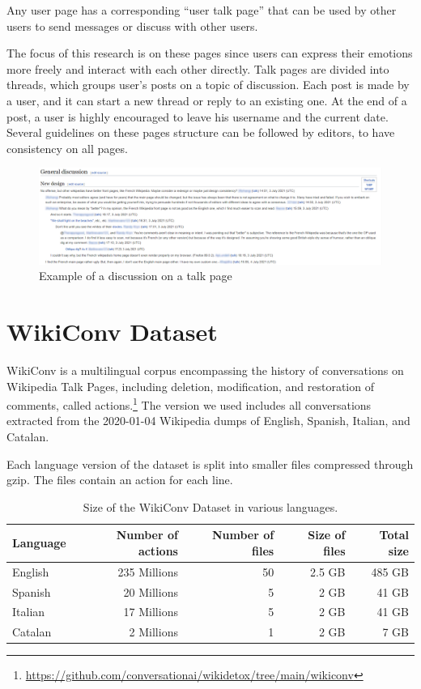 Any user page has a corresponding “user talk page” that can be used by other users to send messages or discuss with other users.

The focus of this research is on these pages since users can express their emotions more freely and interact with each other directly. Talk pages are divided into threads, which groups user’s posts on a topic of discussion. Each post is made by a user, and it can start a new thread or reply to an existing one. At the end of a post, a user is highly encouraged to leave his username and the current date. Several guidelines on these pages structure can be followed by editors, to have consistency on all pages.

\begin{figure}[H]
    \centering
    \includegraphics[width=1\textwidth]{./img/discussion.jpg}
    \caption{Example of a discussion on a talk page}
    \label{fig:discussion}
\end{figure}


\section{WikiConv Dataset}
\label{sec:wikiconvdataset}
WikiConv is a multilingual corpus encompassing the history of conversations on Wikipedia Talk Pages, including deletion, modification, and restoration of comments, called actions.\footnote{\url{https://github.com/conversationai/wikidetox/tree/main/wikiconv}} The version we used includes all conversations extracted from the 2020-01-04 Wikipedia dumps of English, Spanish, Italian, and Catalan.

Each language version of the dataset is split into smaller files compressed through gzip. The files contain an action for each line.

\begin{table}[H]
    \centering
    \begin{tabularx}{\columnwidth}{@{}Xrrrr@{}}
        \midrule
        \textbf{Language} & \textbf{Number of actions} & \textbf{Number of files} & \textbf{Size of files} & \textbf{Total size}\\ \toprule
        English & 235 Millions & 50 & 2.5 GB & 485 GB \\
        Spanish & 20 Millions & 5 & 2 GB & 41 GB \\
        Italian & 17 Millions & 5 & 2 GB & 41 GB \\
        Catalan & 2 Millions & 1 & 2 GB & 7 GB \\

         \bottomrule
    \end{tabularx}
    
    \caption{Size of the WikiConv Dataset in various languages.  \label{table:datasetsize}}
\end{table}

